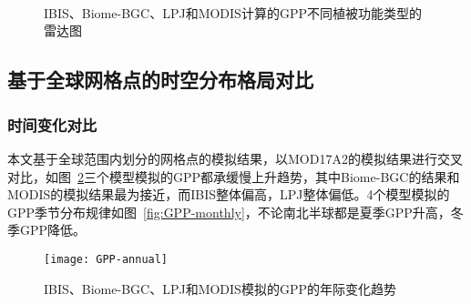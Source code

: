 \begin{figure}[!htbp]
    \centering
    \hfill
     \\
    \hfill
     \\
    \hfill
     \\
    \hfill
    \caption{IBIS、Biome-BGC、LPJ和MODIS计算的GPP不同植被功能类型的雷达图}
    \label{fig:GPP-cmp-taylor}
\end{figure}


\subsection{基于全球网格点的时空分布格局对比}
\subsubsection{时间变化对比}
本文基于全球范围内划分的网格点的模拟结果，以MOD17A2的模拟结果进行交叉对比，如图~\ref{fig:GPP-annual}三个模型模拟的GPP都承缓慢上升趋势，其中Biome-BGC的结果和MODIS的模拟结果最为接近，而IBIS整体偏高，LPJ整体偏低。4个模型模拟的GPP季节分布规律如图~\ref{fig:GPP-monthly}，不论南北半球都是夏季GPP升高，冬季GPP降低。

\begin{figure}[!htbp]
    \centering
    \texttt{[image: GPP-annual]}
    \caption{IBIS、Biome-BGC、LPJ和MODIS模拟的GPP的年际变化趋势}
    \label{fig:GPP-annual}
\end{figure}


